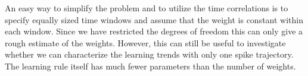 An easy way to simplify the problem and to utilize the time correlations is to specify equally sized time windows and assume that the weight is constant within each window. Since we have restricted the degrees of freedom this can only give a rough estimate of the weights. However, this can still be useful to investigate whether we can characterize the learning trends with only one spike trajectory. The learning rule itself has much fewer parameters than the number of weights. 







